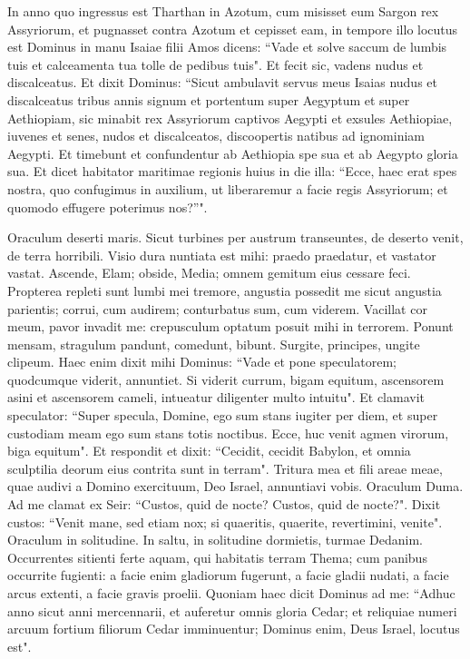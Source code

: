 \begin{biblechapter}  
\verse In anno quo ingressus est Tharthan in Azotum, cum misisset eum Sargon rex Assyriorum, et pugnasset contra Azotum et cepisset eam, 
\verse in tempore illo locutus est Dominus in manu Isaiae filii Amos dicens: “Vade et solve saccum de lumbis tuis et calceamenta tua tolle de pedibus tuis". Et fecit sic, vadens nudus et discalceatus. 
\verse Et dixit Dominus: “Sicut ambulavit servus meus Isaias nudus et discalceatus tribus annis signum et portentum super Aegyptum et super Aethiopiam, 
\verse sic minabit rex Assyriorum captivos Aegypti et exsules Aethiopiae, iuvenes et senes, nudos et discalceatos, discoopertis natibus ad ignominiam Aegypti. 
\verse Et timebunt et confundentur ab Aethiopia spe sua et ab Aegypto gloria sua. 
\verse Et dicet habitator maritimae regionis huius in die illa: “Ecce, haec erat spes nostra, quo confugimus in auxilium, ut liberaremur a facie regis Assyriorum; et quomodo effugere poterimus nos?”". 
\end{biblechapter}

\begin{biblechapter}  
\verse Oraculum deserti maris. Sicut turbines per austrum transeuntes, de deserto venit, de terra horribili. 
\verse Visio dura nuntiata est mihi: praedo praedatur, et vastator vastat. Ascende, Elam; obside, Media; omnem gemitum eius cessare feci. 
\verse Propterea repleti sunt lumbi mei tremore, angustia possedit me sicut angustia parientis; corrui, cum audirem; conturbatus sum, cum viderem. 
\verse Vacillat cor meum, pavor invadit me: crepusculum optatum posuit mihi in terrorem. 
\verse Ponunt mensam, stragulum pandunt, comedunt, bibunt. Surgite, principes, ungite clipeum. 
\verse Haec enim dixit mihi Dominus: “Vade et pone speculatorem; quodcumque viderit, annuntiet. 
\verse Si viderit currum, bigam equitum, ascensorem asini et ascensorem cameli, intueatur diligenter multo intuitu". 
\verse Et clamavit speculator: “Super specula, Domine, ego sum stans iugiter per diem, et super custodiam meam ego sum stans totis noctibus. 
\verse Ecce, huc venit agmen virorum, biga equitum". Et respondit et dixit: “Cecidit, cecidit Babylon, et omnia sculptilia deorum eius contrita sunt in terram". 
\verse Tritura mea et fili areae meae, quae audivi a Domino exercituum, Deo Israel, annuntiavi vobis. 
\verse Oraculum Duma. Ad me clamat ex Seir: “Custos, quid de nocte? Custos, quid de nocte?". 
\verse Dixit custos: “Venit mane, sed etiam nox; si quaeritis, quaerite, revertimini, venite". 
\verse Oraculum in solitudine. In saltu, in solitudine dormietis, turmae Dedanim. 
\verse Occurrentes sitienti ferte aquam, qui habitatis terram Thema; cum panibus occurrite fugienti: 
\verse a facie enim gladiorum fugerunt, a facie gladii nudati, a facie arcus extenti, a facie gravis proelii. 
\verse Quoniam haec dicit Dominus ad me: “Adhuc anno sicut anni mercennarii, et auferetur omnis gloria Cedar; 
\verse et reliquiae numeri arcuum fortium filiorum Cedar imminuentur; Dominus enim, Deus Israel, locutus est". 
\end{biblechapter}

